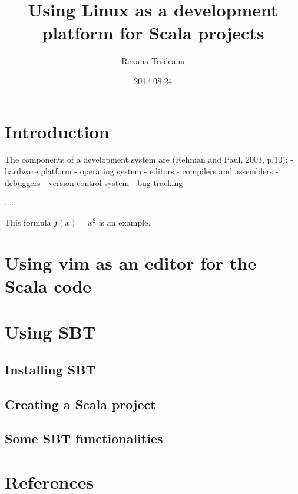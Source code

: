 \documentclass{article}
\title{Using Linux as a development platform for Scala projects}
\date{2017-08-24}
\author{Roxana Tesileanu}
\begin{document}
	\maketitle
	\newpage

\section{Introduction}
The components of a development system are (Rehman and Paul, 2003, p.10):\newline
- hardware platform \newline
- operating system \newline
- editors \newline
- compilers and assemblers \newline
- debuggers \newline
- version control system \newline
- bug tracking \newline

.....

This formula $f(x) = x^2$ is an example.

\section{Using vim as an editor for the Scala code}
\section{Using SBT}
\subsection{Installing SBT}
\subsection{Creating a Scala project}
\subsection{Some SBT functionalities}
\section{References}

  
\end{document}
